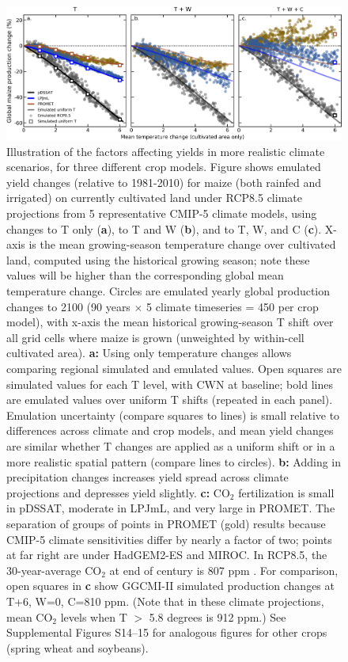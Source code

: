 \documentclass[gmd, manuscript]{copernicus} %
\begin{document}
\begin{figure}[ht]
    \centering
    \includegraphics[width = 16.3cm]{figures/global_em_maize.png}
    \caption{
    Illustration of the factors affecting yields in more realistic climate scenarios, for three different crop models. 
	Figure shows emulated yield changes (relative to 1981-2010) for maize (both rainfed and irrigated) on currently cultivated land under RCP8.5 climate projections from 5 representative CMIP-5 climate models, using changes to T only (\textbf{a}), to T and W (\textbf{b}), and to T, W, and C (\textbf{c}).  X-axis is the mean growing-season temperature change over cultivated land, computed using the historical growing season; note these values will be higher than the corresponding global mean temperature change.
    Circles are emulated yearly global production changes to 2100 (90 years $\times$ 5 climate timeseries = 450 per crop model), with x-axis the mean historical growing-season T shift over all grid cells where maize is grown (unweighted by within-cell cultivated area).
    \textbf{a:} Using only temperature changes allows comparing regional simulated and emulated values. Open squares are simulated values for each T level, with CWN at baseline; bold lines are emulated values over uniform T shifts (repeated in each panel). Emulation uncertainty (compare squares to lines) is small relative to differences across climate and crop models, and 
    mean yield changes are similar whether T changes are applied as a uniform shift or in a more realistic spatial pattern (compare lines to circles). 
    \textbf{b:} Adding in precipitation changes increases yield spread across climate projections and depresses yield slightly. 
    \textbf{c:}  CO$_2$ fertilization is small in pDSSAT, moderate in LPJmL, and very large in PROMET. 
    The separation of groups of points in PROMET (gold) results because CMIP-5 climate sensitivities differ by nearly a factor of two; points at far right are under HadGEM2-ES and MIROC.
    In RCP8.5, the 30-year-average CO$_2$ at end of century is 807 ppm \citep{riahi2011rcp}. 
	For comparison, open squares in \textbf{c} show GGCMI-II simulated production changes at T+6, W=0, C=810 ppm. (Note that  in these climate projections, mean CO$_2$ levels when T $>$ 5.8 degrees is 912 ppm.)
	See Supplemental Figures S14--15 for analogous figures for other crops (spring wheat and soybeans).
    }
    \label{fig:globe_em}
\end{figure}
\end{document}
